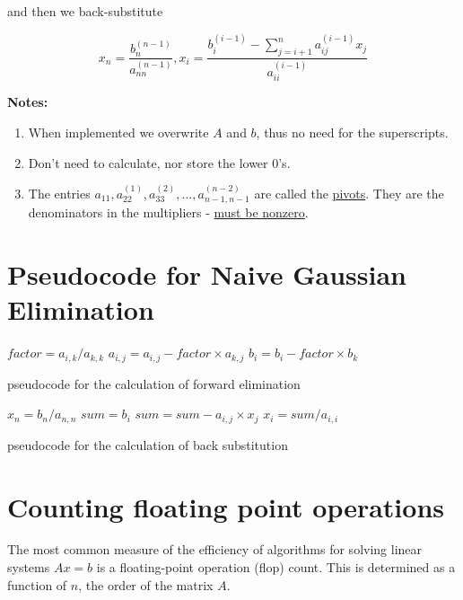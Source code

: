 \documentclass [titlepage,12pt,letter] {article}
\begin{document}
and then we back-substitute

\[
x_n = \frac{b_n^{(n-1)}}{a_{nn}^{(n-1)}}, x_i = \frac{b_i^{(i-1)} - \sum_{j=i+1}^{n} a_{ij}^{(i-1)}x_j}{a_{ii}^{(i-1)}}
\]


{\bf Notes:}
\begin{enumerate}
\item{When implemented we overwrite $A$ and $b$, thus no need for the superscripts.}
\item{Don't need to calculate, nor store the lower $0$'s.}
\item{The entries $a_{11}, a_{22}^{(1)}, a_{33}^{(2)}, ..., a_{n-1,n-1}^{(n-2)}$ are called the \underline{pivots}. 
They are the denominators in the multipliers - \underline{must be nonzero}}.
\end{enumerate}

\section{Pseudocode for Naive Gaussian Elimination} 


\begin{algorithm}[H]
\begin{algorithmic}[1]
\STATE $factor = a_{i,k} / a_{k,k}$
\STATE $a_{i,j} = a_{i,j} - factor \times a_{k,j}$
\ENDFOR 
\STATE $b_i = b_i - factor \times b_k$
\ENDFOR
\ENDFOR
\end{algorithmic}
\caption{pseudocode for the calculation of forward elimination}
\label{alg:seq}
\end{algorithm}


\begin{algorithm}[H]
\begin{algorithmic}[1]
\STATE $x_n = b_n / a_{n,n}$
\STATE $sum = b_i$
\STATE $sum = sum - a_{i,j} \times x_j$
\ENDFOR 
\STATE $x_i = sum / a_{i,i}$ 
\ENDFOR
\end{algorithmic}
\caption{pseudocode for the calculation of back substitution}
\label{alg:seq}
\end{algorithm}


\section{Counting floating point operations} 

The most common measure of the efficiency of algorithms for solving
linear systems $Ax =b$ is a floating-point operation (flop)
count. This is determined as a function of $n$, the order of the matrix
$A$.
\end{document}
